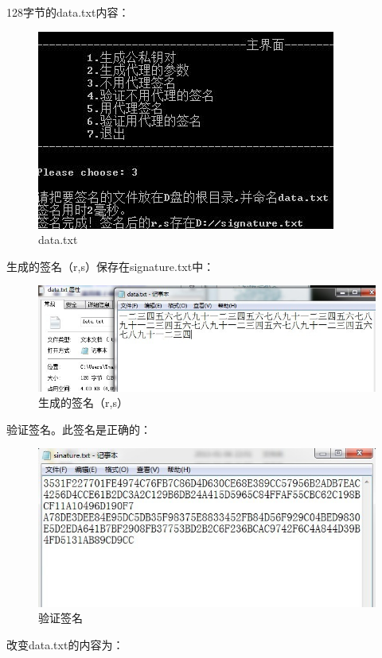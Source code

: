 128字节的data.txt内容：

\begin{figure}[H]
\centering
\includegraphics{img/10.jpg}
\caption{data.txt}
\end{figure}

生成的签名（r,s）保存在signature.txt中：

\begin{figure}[H]
\centering
\includegraphics{img/11.jpg}
\caption{生成的签名（r,s）}
\end{figure}

验证签名。此签名是正确的：

\begin{figure}[H]
\centering
\includegraphics{img/12.jpg}
\caption{验证签名}
\end{figure}

改变data.txt的内容为：


